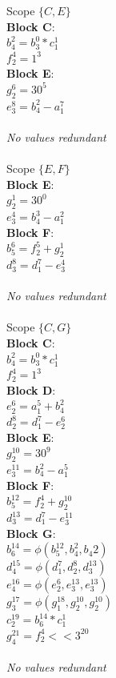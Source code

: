 \documentclass[11pt]{article}
\begin{document}
\begin{enumerate}
\begin{Answer}
		Scope $\{C, E\}$ \\
		\textbf{Block C}: \\
		$b_4^2 = b_3^0 * c_1^1$ \\
		$f_2^4 = 1^3$ \\
		\textbf{Block E}: \\
		$g_2^6 = 30^5$ \\
		$e_3^8 = b_4^2 - a_1^7$ \\
		\\
		\textit{No values redundant} \\ 
		\\
		
		Scope $\{E, F\}$ \\
		\textbf{Block E}: \\
		$g_2^1 = 30^0$ \\
		$e_3^4 = b_4^3 - a_1^2$ \\
		\textbf{Block F}: \\
		$b_5^6 = f_2^5 + g_2^1$ \\
		$d_3^8 = d_1^7 - e_3^4$ \\
		\\
		\textit{No values redundant} \\
		\\
		
		Scope $\{C, G\}$ \\		
		\textbf{Block C}: \\
		$b_4^2 = b_3^0 * c_1^1$ \\
		$f_2^4 = 1^3$ \\
		\textbf{Block D}: \\
		$e_2^6 = a_1^5 + b_4^2$ \\
		$d_2^8 = d_1^7 - e_2^6$ \\
		\textbf{Block E}: \\
		$g_2^{10} = 30^9$ \\
		$e_3^{11} = b_4^2 - a_1^5$ \\
		\textbf{Block F}: \\
		$b_5^{12} = f_2^4 + g_2^{10}$ \\
		$d_3^{13} = d_1^7 - e_3^{11}$ \\
		\textbf{Block G}: \\
		$b_6^{14} = \phi(b_5^{12}, b_4^{2}, b_4{2})$ \\
		$d_4^{15} = \phi(d_1^7, d_2^8, d_3^{13})$ \\
		$e_4^{16} = \phi(e_2^6, e_3^{13}, e_3^{13})$ \\
		$g_3^{17} = \phi(g_1^{18}, g_2^{10}, g_2^{10})$ \\
		$c_2^{19} = b_6^{14} * c_1^1$ \\
		$g_4^{21} = f_2^4 << 3^{20}$ \\
		\\
		\textit{No values redundant} \\ 
		\\
		

\end{Answer}
\end{enumerate}
\end{document}

